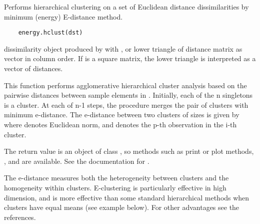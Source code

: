 \documentclass{article}
\begin{document}
\begin{Description}\relax
Performs hierarchical clustering on a set of Euclidean distance 
dissimilarities by minimum (energy) E-distance method.
\end{Description}
\begin{Usage}
\begin{verbatim}
    energy.hclust(dst)
\end{verbatim}
\end{Usage}
\begin{Arguments}
\begin{ldescription}
\item[\code{dst}] dissimilarity object produced by  with
, or lower triangle of distance
matrix as vector in column order. If  is a square
matrix, the lower triangle is interpreted as a vector of
distances.
\end{ldescription}
\end{Arguments}
\begin{Details}\relax
This function performs agglomerative hierarchical cluster analysis
based on the pairwise distances between sample elements in .
Initially, each of the n singletons is a cluster. At each of n-1 steps, the 
procedure merges the pair of clusters with minimum e-distance. 
The e-distance
between two clusters  of sizes  is given by
where
\eqn{\|\cdot\|}{|| ||} denotes Euclidean norm, and  denotes the p-th observation in the i-th cluster.  

The return value is an object of class , so 
methods such as print or plot methods, , and 
are available. See the documentation for .

The e-distance measures both the heterogeneity between clusters and the
homogeneity within clusters. E-clustering is particularly effective in
high dimension, and is more effective than some standard hierarchical
methods when clusters have equal means (see example below).
For other advantages see the references.\end{Details}
\end{document}
